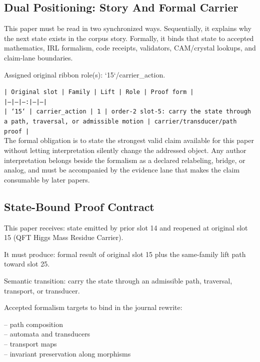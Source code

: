 \documentclass[11pt]{article}
\begin{document}
\subsection*{Dual Positioning: Story And Formal Carrier}

This paper must be read in two synchronized ways. Sequentially, it explains why
the next state exists in the corpus story. Formally, it binds that state to
accepted mathematics, IRL formalism, code receipts, validators, CAM/crystal
lookups, and claim-lane boundaries.

Assigned original ribbon role(s): `15`/carrier\_action.

\noindent\texttt{| Original slot | Family | Lift | Role | Proof form |}\\
\noindent\texttt{|---|---|---:|---|---|}\\
\noindent\texttt{| `15` | carrier\_action | 1 | order-2 slot-5: carry the state through a path, traversal, or admissible motion | carrier/transducer/path proof |}\\

The formal obligation is to state the strongest valid claim available for this
paper without letting interpretation silently change the addressed object. Any
author interpretation belongs beside the formalism as a declared relabeling,
bridge, or analog, and must be accompanied by the evidence lane that makes the
claim consumable by later papers.

\subsection*{State-Bound Proof Contract}

This paper receives: state emitted by prior slot 14 and reopened at original slot 15 (QFT Higgs Mass Residue Carrier).

It must produce: formal result of original slot 15 plus the same-family lift path toward slot 25.

Semantic transition: carry the state through an admissible path, traversal, transport, or transducer.

Accepted formalism targets to bind in the journal rewrite:

\noindent{}-- path composition\\
\noindent{}-- automata and transducers\\
\noindent{}-- transport maps\\
\noindent{}-- invariant preservation along morphisms\\
\end{document}
